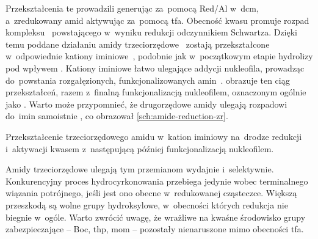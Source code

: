 Przekształcenia te prowadzili generując \schwartz{} \insitu{} za~pomocą Red\-/Al w~\gls{dcm},
  a~zredukowany amid aktywując za~pomocą \gls{tfa}.
Obecność kwasu promuje rozpad
  kompleksu~ powstającego w~wyniku redukcji odczynnikiem Schwartza.
Dzięki temu poddane działaniu \schwartz{} amidy trzeciorzędowe~ zostają
  przekształcone w~odpowiednie kationy iminiowe~, podobnie jak w~początkowym
  etapie hydrolizy pod wpływem .
Kationy iminiowe łatwo ulegające addycji nukleofila, prowadząc do~powstania rozgałęzionych,
  funkcjonalizowanych amin~.
 obrazuje ten ciąg przekształceń, razem z~finalną funkcjonalizacją
  nukleofilem, oznaczonym ogólnie jako .
Warto może przypomnieć, że drugorzędowe amidy ulegają rozpadowi do~imin samoistnie%
  , co obrazował \cref{sch:amide-reduction-zr}.
\begin{scheme*}
  
  \caption{
    Przekształcenie trzeciorzędowego amidu w~kation iminiowy na~drodze redukcji i~aktywacji kwasem
      z~następującą później funkcjonalizacją nukleofilem.
  }
  \label{sch:amide-tert-zr-reduction}
\end{scheme*}

Amidy trzeciorzędowe ulegają tym przemianom wydajnie i~selektywnie.
Konkurencyjny proces hydrocyrkonowania przebiega jedynie wobec terminalnego wiązania potrójnego,
  jeśli jest ono obecne w~redukowanej cząsteczce.
Większą przeszkodą są wolne grupy hydroksylowe, w~obecności których redukcja nie biegnie w~ogóle.
Warto zwrócić uwagę, że wrażliwe na kwaśne środowisko grupy zabezpieczające \--- \gls{Boc},
  \gls{thp}, \gls{mom} \--- pozostały nienaruszone mimo obecności \gls{tfa}.

